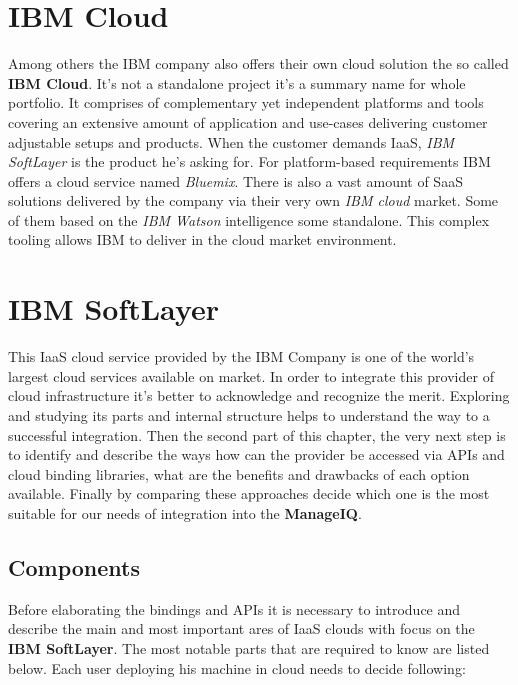 \chapter{IBM Cloud}
\label{chap:IBM Cloud}

Among others the IBM company also offers their own cloud solution the so called \textbf{IBM Cloud}. It's not a standalone project it's a summary name for whole portfolio. It comprises of complementary yet independent platforms and tools covering an extensive amount of application and use-cases delivering customer adjustable setups and products. When the customer demands IaaS, \emph{IBM SoftLayer} is the product he's asking for. For platform-based requirements IBM offers a cloud service named \emph{Bluemix}. There is also a vast amount of SaaS solutions delivered by the company via their very own \emph{IBM cloud} market. Some of them based on the \emph{IBM Watson} intelligence some standalone. This complex tooling allows IBM to deliver in the cloud market environment.

\chapter{IBM SoftLayer}
\label{chap:IBM SoftLayer}

This IaaS cloud service provided by the IBM Company is one of the world's largest cloud services available on market. In order to integrate this provider of cloud infrastructure it's better to acknowledge and recognize the merit. Exploring and studying its parts and internal structure helps to understand the way to a successful integration. Then the second part of this chapter, the very next step is to identify and describe the ways how can the provider be accessed via APIs and cloud binding libraries, what are the benefits and drawbacks of each option available. Finally by comparing these approaches decide which one is the most suitable for our needs of integration into the \textbf{ManageIQ}.

\section{Components}
\label{sec:Components}

Before elaborating the bindings and APIs it is necessary to introduce and describe the main and most important ares of IaaS clouds with focus on the \textbf{IBM SoftLayer}. The most notable parts that are required to know are listed below. Each user deploying his machine in cloud needs to decide following:

